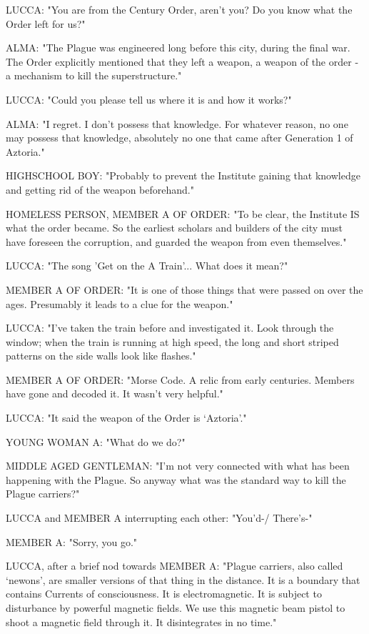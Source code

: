 \documentclass[11pt]{article}
\begin{document}
LUCCA: "You are from the Century Order, aren't you? 
Do you know what the Order left for us?"

ALMA: "The Plague was engineered long before this city, during the final war. 
The Order explicitly mentioned that they left a weapon, a weapon of the order - a mechanism to kill the superstructure."

LUCCA: "Could you please tell us where it is and how it works?"

ALMA: "I regret. I don't possess that knowledge. For whatever reason, no one may possess that knowledge, absolutely no one that came after Generation 1 of Aztoria."

HIGHSCHOOL BOY: "Probably to prevent the Institute gaining that knowledge and getting rid of the weapon beforehand."

HOMELESS PERSON, MEMBER A OF ORDER: "To be clear, the Institute IS what the order became. 
So the earliest scholars and builders of the city must have foreseen the corruption, and guarded the weapon from even themselves."

LUCCA: "The song 'Get on the A Train'... What does it mean?"

MEMBER A OF ORDER: "It is one of those things that were passed on over the ages. 
Presumably it leads to a clue for the weapon."

LUCCA: "I've taken the train before and investigated it.
Look through the window; when the train is running at high speed, the long and short striped patterns on the side walls look like flashes."

MEMBER A OF ORDER: "Morse Code. 
A relic from early centuries.
Members have gone and decoded it. 
It wasn't very helpful."

LUCCA: "It said the weapon of the Order is `Aztoria'."

YOUNG WOMAN A: "What do we do?"

MIDDLE AGED GENTLEMAN: "I'm not very connected with what has been happening with the Plague. 
So anyway what was the standard way to kill the Plague carriers?"

LUCCA and MEMBER A interrupting each other: "You'd-/ There's-"

MEMBER A: "Sorry, you go."

LUCCA, after a brief nod towards MEMBER A: "Plague carriers, also called `newons', are smaller versions of that thing in the distance. 
It is a boundary that contains Currents of consciousness. 
It is electromagnetic.
It is subject to disturbance by powerful magnetic fields.
We use this magnetic beam pistol to shoot a magnetic field through it.
It disintegrates in no time."
\end{document}
